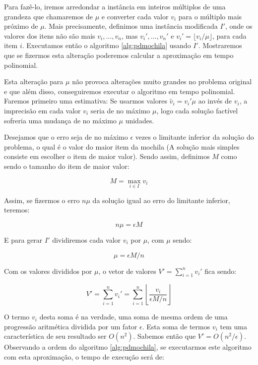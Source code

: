 Para fazê-lo, iremos arredondar a instância em inteiros múltiplos de uma grandeza que chamaremos de $\mu$ e converter cada valor $v_i$ para o múltiplo mais próximo de $\mu$. Mais precisamente, definimos uma instância modificada $I'$, onde os valores dos itens não são mais $v_i,\ldots,v_n$, mas $v_i',\ldots,v_n'$ e $v_i' = \lfloor v_i / \mu \rfloor$, para cada item $i$. Executamos então o algoritmo \ref{alg:pdmochila} usando $I'$. Mostraremos que se fizermos esta alteração poderemos calcular a aproximação em tempo polinomial.

Esta alteração para $\mu$ não provoca alterações muito grandes no problema original e que além disso, conseguiremos executar o algoritmo em tempo polinomial. Faremos primeiro uma estimativa: Se usarmos valores $\tilde{v_i} = v_i'\mu$ ao invés de $v_i$, a imprecisão em cada valor $v_i$ seria de no máximo $\mu$, logo cada solução factível sofreria uma mudança de no máximo $\mu$ unidades.

Desejamos que o erro seja de no máximo $\epsilon$ vezes o limitante inferior da solução do problema, o qual é o valor do maior item da mochila (A solução mais simples consiste em escolher o item de maior valor). Sendo assim, definimos $M$ como sendo o tamanho do item de maior valor:

\begin{equation} 
M = \max_{i \in I} v_i
\end{equation}

Assim, se fizermos o erro $n\mu$ da solução igual ao erro do limitante inferior, teremos:

\begin{equation}
n\mu = \epsilon M
\end{equation}

E para gerar $I'$ dividiremos cada valor $v_i$ por $\mu$, com $\mu$ sendo:

\begin{equation}
\mu = \epsilon M / n
\end{equation}

Com os valores divididos por $\mu$, o vetor de valores $V' = \sum_{i=1}^{n} v_i'$ fica sendo:

\begin{equation}
V' = \sum_{i=1}^{n} v_i' = \sum_{i=1}^n \left\lfloor \frac{v_i}{\epsilon M / n} \right\rfloor
\end{equation}

O termo $v_i$ desta soma é na verdade, uma soma de mesma ordem de uma progressão aritmética dividida por um fator $\epsilon$. Esta soma de termos $v_i$ tem uma característica de seu resultado ser $O(n^2)$. Sabemos então que $V' = O(n^2/ \epsilon)$. Observando a ordem do algoritmo \ref{alg:pdmochila}, se executarmos este algoritmo com esta aproximação, o tempo de execução será de:

